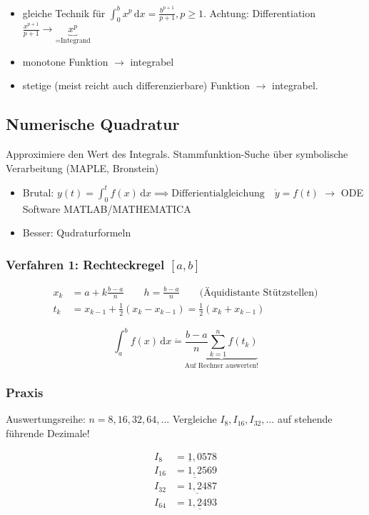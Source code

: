 \begin{note}
	\begin{itemize}
		\item gleiche Technik für \( \int_0^b x^p\,\mathrm{d}x= \frac{b^{p+1}}{p+1}, p \geq 1 \).
		\newline Achtung: Differentiation \( \frac{x^{p+1}}{p+1} \rightarrow \underbrace{x^p}_{=\text{Integrand}} \)
		\item monotone Funktion \( \rightarrow \) integrabel
		\item stetige (meist reicht auch differenzierbare) Funktion \( \rightarrow \) integrabel.
	\end{itemize}	
\end{note} 

\subsection{Numerische Quadratur}
Approximiere den Wert des Integrals. Stammfunktion-Suche über symbolische Verarbeitung (MAPLE, Bronstein)

\begin{itemize}
	\item Brutal: \( y(t) = \int_0^t f(x) \,\mathrm{d}x \implies \text{Differientialgleichung} \quad \dot{y} = f(t) \) \newline \( \rightarrow \) ODE Software MATLAB/MATHEMATICA
	\item Besser: Qudraturformeln
\end{itemize}

\subsubsection{Verfahren 1: Rechteckregel $[a,b]$}
\begin{align*}
	x_k &= a+ k \frac{b-a}{n} \qquad h= \frac{b-a}{n} \qquad \text{(Äquidistante Stützstellen)} \\
	t_k &= x_{k-1}+\frac{1}{2}(x_k-x_{k-1})= \frac{1}{2}(x_k+x_{k-1})
\end{align*}


\[ \int_a^b f(x) \,\mathrm{d}x \dot{=} \underbrace{\frac{b-a}{n} \sum_{k=1}^n f(t_k)}_{\text{Auf Rechner auswerten!}} \]

\subsubsection{Praxis}

Auswertungsreihe: \( n=8, 16, 32, 64, \ldots \) \newline
Vergleiche \( I_8,I_{16}, I_{32}, \ldots\) auf stehende führende Dezimale!

\begin{align*}
	I_8 &= \underline{1},0578 \\
	I_{16} &= \underline{1,2}569 \\
	I_{32} &= \underline{1,24}87 \\
	I_{64} &= \underline{1,249}3 \\
\end{align*}





